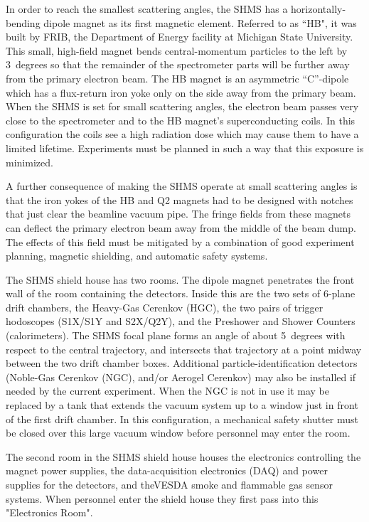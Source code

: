 In order to reach the smallest scattering angles, the SHMS has a horizontally-bending dipole
magnet as its first magnetic element. Referred to as ``HB", it was built by FRIB, the Department of Energy
facility at Michigan State  University. This small, high-field magnet bends
central-momentum particles to the left by 3~degrees so that the remainder of the
spectrometer parts will be further away from the primary electron beam. The HB
magnet is an asymmetric ``C''-dipole which has a flux-return iron yoke only on
the side away from the primary beam. When the SHMS is set for small scattering
angles, the electron beam passes very close to the spectrometer and to the
HB magnet's superconducting
coils. In this configuration the coils see a high radiation dose which may cause
them to have a limited
lifetime. Experiments must be planned in such a way that this exposure is minimized.

A further consequence of making the SHMS operate at small scattering angles is
that the iron yokes of the HB and Q2 magnets had to be designed with notches
that just clear the beamline vacuum pipe. The fringe fields from these magnets can
deflect the primary electron beam away from the middle of the beam dump.
The effects of this field
must be mitigated by a combination of good experiment planning, magnetic shielding,
and automatic safety systems.

The SHMS shield house has two rooms. The dipole magnet penetrates the front
wall of the room containing the detectors. Inside this are the two sets of 6-plane
drift chambers, the Heavy-Gas Cerenkov (HGC), the two pairs of trigger hodoscopes
(S1X/S1Y and S2X/Q2Y), and
the Preshower and Shower Counters (calorimeters). The SHMS focal plane forms an
angle of about 5~degrees with respect to the central trajectory,
and intersects that trajectory at
a point midway between the two drift chamber boxes. Additional  particle-identification
detectors (Noble-Gas Cerenkov (NGC), and/or Aerogel Cerenkov) may also be
installed if needed by the current experiment. When the NGC is not in use it may
be replaced by a tank that extends the vacuum system up  to a window just in
front of the first drift chamber. In this configuration, a mechanical safety shutter
must be closed over this large vacuum window before personnel may enter the
room.

The second room in the SHMS shield house houses the
electronics controlling the magnet power supplies, the data-acquisition
electronics (DAQ) and power supplies for the detectors, and theVESDA
smoke and flammable gas sensor systems. When personnel enter the shield
house they first pass into this "Electronics Room".

